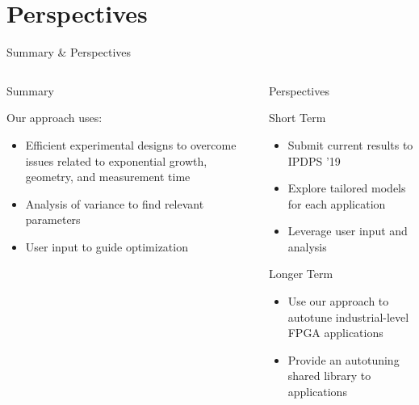 \documentclass[10pt, compress, aspectratio=169, xcolor={table,usenames,dvipsnames}]{beamer}
\begin{document}
\section{Perspectives}
\label{sec:orga1eff85}
\begin{frame}[label={sec:orgf8630d4}]{Summary \& Perspectives}
\begin{columns}
\begin{column}{0.5\columnwidth}
\begin{block}{Summary}
\vspace{.2cm}

Our approach uses:

\begin{itemize}
\item \alert{Efficient experimental designs} to overcome issues related to \alert{exponential growth}, \alert{geometry}, and \alert{measurement time}
\item \alert{Analysis of variance} to find \alert{relevant parameters}
\item \alert{User input} to guide optimization
\end{itemize}

\vspace{2cm}
\end{block}
\end{column}
\begin{column}{0.5\columnwidth}
\begin{block}{Perspectives}
\begin{block}{\alert{Short Term}}
\begin{itemize}
\item Submit current results to \alert{IPDPS '19}
\item Explore \alert{tailored models} for each application
\item Leverage \alert{user input} and \alert{analysis}
\end{itemize}
\end{block}

\begin{block}{\alert{Longer Term}}
\begin{itemize}
\item Use our approach to \alert{autotune industrial-level FPGA applications}
\item Provide an \alert{autotuning shared library} to applications
\end{itemize}
\end{block}
\end{block}
\end{column}
\end{columns}
\end{frame}
\end{document}
